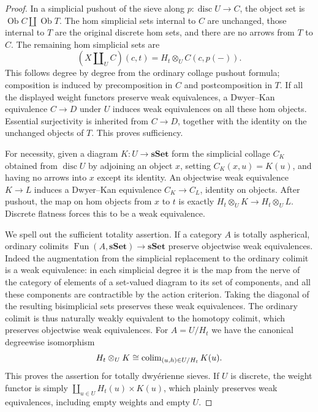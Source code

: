 \begin{proof}
In a simplicial pushout of the sieve along
$p:\operatorname{disc}U\to C$, the object set is
$\operatorname{Ob}C\amalg\operatorname{Ob}T$. The hom simplicial
sets internal to $C$ are unchanged, those internal to $T$ are the
original discrete hom sets, and there are no arrows from $T$ to
$C$. The remaining hom simplicial sets are
\[
 (X\amalg_U C)(c,t)=H_t\otimes_U C(c,p(-)).
\]
This follows degree by degree from the ordinary collage pushout
formula; composition is induced by precomposition in $C$ and
postcomposition in $T$. If all the displayed weight functors
preserve weak equivalences, a Dwyer--Kan equivalence $C\to D$
under $U$ induces weak equivalences on all these hom objects.
Essential surjectivity is inherited from $C\to D$, together with
the identity on the unchanged objects of $T$. This proves
sufficiency.

For necessity, given a diagram $K:U\to\mathbf{sSet}$ form the
simplicial collage $C_K$ obtained from $\operatorname{disc}U$ by
adjoining an object $x$, setting $C_K(x,u)=K(u)$, and having no
arrows into $x$ except its identity. An objectwise weak equivalence
$K\to L$ induces a Dwyer--Kan equivalence $C_K\to C_L$,
identity on objects. After pushout, the map on hom objects from
$x$ to $t$ is exactly $H_t\otimes_U K\to H_t\otimes_U L$.
Discrete flatness forces this to be a weak equivalence.

We spell out the sufficient totality assertion. If a category $A$
is totally aspherical, ordinary colimits
$\operatorname{Fun}(A,\mathbf{sSet})\to\mathbf{sSet}$ preserve
objectwise weak equivalences. Indeed the augmentation from the
simplicial replacement to the ordinary colimit is a weak
equivalence: in each simplicial degree it is the map from the
nerve of the category of elements of a set-valued diagram to its
set of components, and all these components are contractible by
the action criterion. Taking the diagonal of the resulting
bisimplicial sets preserves these weak equivalences. The ordinary
colimit is thus naturally weakly equivalent to the homotopy
colimit, which preserves objectwise weak equivalences.
For $A=U/H_t$ we have the canonical degreewise isomorphism
\[
 H_t\otimes_U K\cong\operatorname{colim}_{(u,h)\in U/H_t}K(u).
\]
This proves the assertion for totally dwy\'erienne sieves.
If $U$ is discrete, the weight functor is simply
$\coprod_{u\in U}H_t(u)\times K(u)$, which plainly preserves
weak equivalences, including empty weights and empty $U$.
\end{proof}

